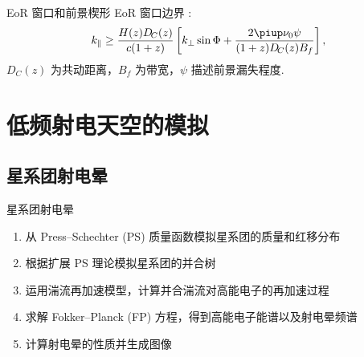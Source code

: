 \documentclass{beamer}
\newcommand{\Cpi}{\piup}  %
\begin{document}
\begin{frame}{EoR 窗口和前景楔形}
  \alert{EoR 窗口}边界 \cite{thyagarajan2013}:
  \begin{equation}
    \label{eq:eor-window}
    k_{\parallel} \ge
      \frac{H(z) D_{\!C}(z)}{c (1+z)}
      \left[ k_{\perp} \sin\Phi
        + \frac{2\Cpi \nu_0 \psi}{(1+z) D_{\!C}(z) B_f} \right] ,
  \end{equation}
  $D_{\!C}(z)$ 为共动距离，$B_f$ 为带宽，$\psi$ 描述前景漏失程度.

  \vspace{-2ex}
\end{frame}


\section{低频射电天空的模拟}

\subsection{星系团射电晕}

\begin{frame}{星系团射电晕}
  \begin{enumerate}
    \item 从 Press--Schechter (PS) 质量函数模拟星系团的质量和红移分布
    \item 根据扩展 PS 理论模拟星系团的并合树
    \item 运用湍流再加速模型，计算并合湍流对高能电子的再加速过程
    \item 求解 Fokker--Planck (FP) 方程，得到高能电子能谱以及射电晕频谱
    \item 计算射电晕的性质并生成图像
  \end{enumerate}
\end{frame}
\end{document}
